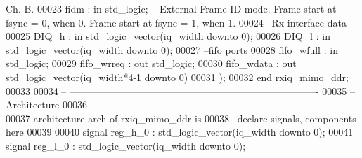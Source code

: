 \begin{DoxyCode}
{       Ch. B. }
00023       \textcolor{vhdlchar}{fidm}         \textcolor{vhdlchar}{:} \textcolor{keywordflow}{in} \textcolor{comment}{std\_logic};\textcolor{keyword}{ -- External Frame ID mode. Frame start at fsync = 0, when 0. Frame start
       at fsync = 1, when 1.}
00024 \textcolor{keyword}{      --Rx interface data }
00025       \textcolor{vhdlchar}{DIQ_h}         \textcolor{vhdlchar}{:} \textcolor{keywordflow}{in} \textcolor{comment}{std\_logic\_vector}\textcolor{vhdlchar}{(}\textcolor{vhdlchar}{iq_width} \textcolor{keywordflow}{downto} \textcolor{vhdllogic}{}\textcolor{vhdllogic}{0}\textcolor{vhdlchar}{)};
00026         \textcolor{vhdlchar}{DIQ_l}          \textcolor{vhdlchar}{:} \textcolor{keywordflow}{in} \textcolor{comment}{std\_logic\_vector}\textcolor{vhdlchar}{(}\textcolor{vhdlchar}{iq_width} \textcolor{keywordflow}{downto} \textcolor{vhdllogic}{}\textcolor{vhdllogic}{0}\textcolor{vhdlchar}{)};
00027 \textcolor{keyword}{      --fifo ports }
00028       \textcolor{vhdlchar}{fifo_wfull}  \textcolor{vhdlchar}{:} \textcolor{keywordflow}{in} \textcolor{comment}{std\_logic};
00029       \textcolor{vhdlchar}{fifo_wrreq}  \textcolor{vhdlchar}{:} \textcolor{keywordflow}{out} \textcolor{comment}{std\_logic};
00030       \textcolor{vhdlchar}{fifo_wdata}  \textcolor{vhdlchar}{:} \textcolor{keywordflow}{out} \textcolor{comment}{std\_logic\_vector}\textcolor{vhdlchar}{(}\textcolor{vhdlchar}{iq_width}\textcolor{vhdlchar}{*}\textcolor{vhdllogic}{4-1} \textcolor{keywordflow}{downto} \textcolor{vhdllogic}{}\textcolor{vhdllogic}{0}\textcolor{vhdlchar}{)}   
00031         \textcolor{vhdlchar}{)};
00032 \textcolor{keywordflow}{end} \textcolor{vhdlchar}{rxiq\_mimo\_ddr};
00033 
00034 \textcolor{keyword}{-- ----------------------------------------------------------------------------}
00035 \textcolor{keyword}{-- Architecture}
00036 \textcolor{keyword}{-- ----------------------------------------------------------------------------}
00037 \textcolor{keywordflow}{architecture} arch \textcolor{keywordflow}{of} rxiq_mimo_ddr is
00038 \textcolor{keyword}{--declare signals,  components here}
00039 
00040 \textcolor{keywordflow}{signal} \textcolor{vhdlchar}{reg_h_0}             \textcolor{vhdlchar}{:} \textcolor{comment}{std\_logic\_vector}\textcolor{vhdlchar}{(}\textcolor{vhdlchar}{iq_width} \textcolor{keywordflow}{downto} \textcolor{vhdllogic}{}\textcolor{vhdllogic}{0}\textcolor{vhdlchar}{)};
00041 \textcolor{keywordflow}{signal} \textcolor{vhdlchar}{reg_l_0}             \textcolor{vhdlchar}{:} \textcolor{comment}{std\_logic\_vector}\textcolor{vhdlchar}{(}\textcolor{vhdlchar}{iq_width} \textcolor{keywordflow}{downto} \textcolor{vhdllogic}{}\textcolor{vhdllogic}{0}\textcolor{vhdlchar}{)};

\end{DoxyCode}
